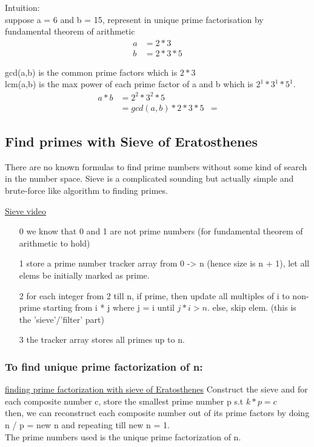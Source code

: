 \documentclass[12pt]{article}
\begin{document}
Intuition: \\ 

suppose a = 6 and b = 15, represent in unique prime factorisation by fundamental theorem of arithmetic 
\begin{align} 
a &= 2 * 3 \\
b &= 2 * 3 * 5 
\end{align} 

gcd(a,b) is the common prime factors which is \(2 * 3\) \\
lcm(a,b) is the max power of each prime factor of a and b which is \(2^1 * 3^1 * 5^1\). \\ 

\begin{align} 
a * b &= 2^2 * 3^2 * 5 \\
&= gcd(a, b) * 2 * 3 * 5
&= 
\end{align} 

\subsection{Find primes with Sieve of Eratosthenes} 
There are no known formulas to find prime numbers without some kind of search in the number space. 
Sieve is a complicated sounding but actually simple and brute-force like algorithm to finding primes. 

\href{https://www.khanacademy.org/computing/computer-science/cryptography/comp-number-theory/v/sieve-of-eratosthenes-prime-adventure-part-4}{Sieve video}
\begin{itemize} 
	\item[0] we know that 0 and 1 are not prime numbers (for fundamental theorem of arithmetic to hold) 
	\item[1] store a prime number tracker array from 0 -> n (hence size is n + 1), let all elems be initially marked as prime.  
	\item[2] for each integer from 2 till n, if prime, then update all multiples of i to non-prime starting from i * j where j = i until {\emph{\(j * i > n\)}}. else, skip elem. (this is the 'sieve'/'filter' part) 
	\item[3] the tracker array stores all primes up to n. 
\end{itemize} 

\subsubsection{To find unique prime factorization of n:}
\href{https://www.geeksforgeeks.org/prime-factorization-using-sieve-olog-n-multiple-queries/}{finding prime factorization with sieve of Eratosthenes} 
Construct the sieve and for each composite number c, store the smallest prime number p s.t \(k * p = c\) \\ 
then, we can reconstruct each composite number out of its prime factors by doing n / p = new n and repeating till new n = 1. \\ 
The prime numbers used is the unique prime factorization of n. 
\end{document}
